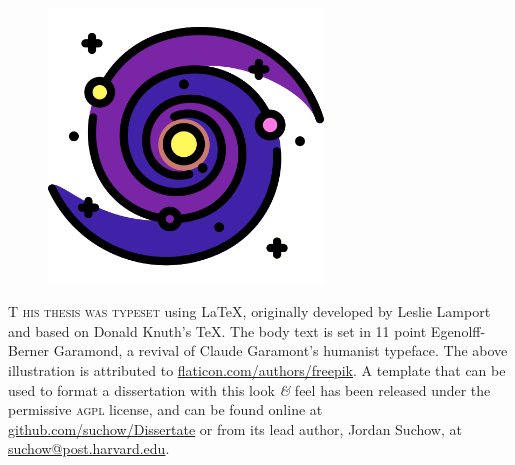 
\vspace*{100pt}

\begin{figure}[h!]
  \centering
  \includegraphics[width=0.65\textwidth]{endmatter/galaxyFreepikFlaticon.png}
\end{figure}

\newpage

\begin{center}
\parbox{200pt}{\lettrine[lines=3,slope=-2pt,nindent=-4pt]{\textcolor{SchoolColor}{T}}{ his thesis was typeset} using \LaTeX, originally developed by Leslie Lamport and based on Donald Knuth's \TeX. The body text is set in 11 point Egenolff-Berner Garamond, a revival of Claude Garamont's humanist typeface. The above illustration is attributed to \href{https://www.flaticon.com/authors/freepik}{flaticon.com/authors/freepik}. A template that can be used to format a dissertation with this look \textit{\&} feel has been released under the permissive \textsc{agpl} license, and can be found online at \href{https://github.com/suchow/Dissertate}{github.com/suchow/Dissertate} or from its lead author, Jordan Suchow, at \href{mailto:suchow@post.harvard.edu}{suchow@post.harvard.edu}.}
\end{center}
